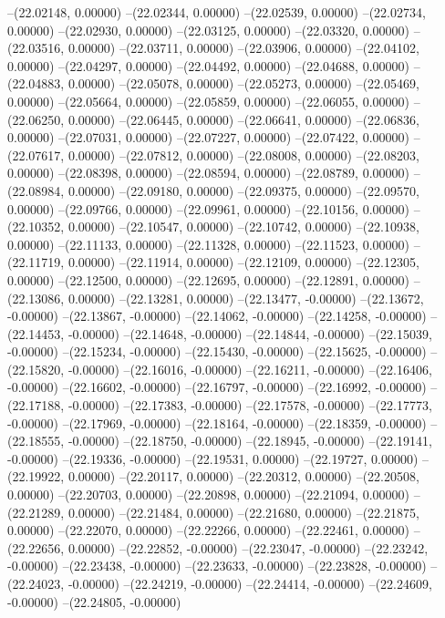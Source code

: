 --(22.02148, 0.00000)
--(22.02344, 0.00000)
--(22.02539, 0.00000)
--(22.02734, 0.00000)
--(22.02930, 0.00000)
--(22.03125, 0.00000)
--(22.03320, 0.00000)
--(22.03516, 0.00000)
--(22.03711, 0.00000)
--(22.03906, 0.00000)
--(22.04102, 0.00000)
--(22.04297, 0.00000)
--(22.04492, 0.00000)
--(22.04688, 0.00000)
--(22.04883, 0.00000)
--(22.05078, 0.00000)
--(22.05273, 0.00000)
--(22.05469, 0.00000)
--(22.05664, 0.00000)
--(22.05859, 0.00000)
--(22.06055, 0.00000)
--(22.06250, 0.00000)
--(22.06445, 0.00000)
--(22.06641, 0.00000)
--(22.06836, 0.00000)
--(22.07031, 0.00000)
--(22.07227, 0.00000)
--(22.07422, 0.00000)
--(22.07617, 0.00000)
--(22.07812, 0.00000)
--(22.08008, 0.00000)
--(22.08203, 0.00000)
--(22.08398, 0.00000)
--(22.08594, 0.00000)
--(22.08789, 0.00000)
--(22.08984, 0.00000)
--(22.09180, 0.00000)
--(22.09375, 0.00000)
--(22.09570, 0.00000)
--(22.09766, 0.00000)
--(22.09961, 0.00000)
--(22.10156, 0.00000)
--(22.10352, 0.00000)
--(22.10547, 0.00000)
--(22.10742, 0.00000)
--(22.10938, 0.00000)
--(22.11133, 0.00000)
--(22.11328, 0.00000)
--(22.11523, 0.00000)
--(22.11719, 0.00000)
--(22.11914, 0.00000)
--(22.12109, 0.00000)
--(22.12305, 0.00000)
--(22.12500, 0.00000)
--(22.12695, 0.00000)
--(22.12891, 0.00000)
--(22.13086, 0.00000)
--(22.13281, 0.00000)
--(22.13477, -0.00000)
--(22.13672, -0.00000)
--(22.13867, -0.00000)
--(22.14062, -0.00000)
--(22.14258, -0.00000)
--(22.14453, -0.00000)
--(22.14648, -0.00000)
--(22.14844, -0.00000)
--(22.15039, -0.00000)
--(22.15234, -0.00000)
--(22.15430, -0.00000)
--(22.15625, -0.00000)
--(22.15820, -0.00000)
--(22.16016, -0.00000)
--(22.16211, -0.00000)
--(22.16406, -0.00000)
--(22.16602, -0.00000)
--(22.16797, -0.00000)
--(22.16992, -0.00000)
--(22.17188, -0.00000)
--(22.17383, -0.00000)
--(22.17578, -0.00000)
--(22.17773, -0.00000)
--(22.17969, -0.00000)
--(22.18164, -0.00000)
--(22.18359, -0.00000)
--(22.18555, -0.00000)
--(22.18750, -0.00000)
--(22.18945, -0.00000)
--(22.19141, -0.00000)
--(22.19336, -0.00000)
--(22.19531, 0.00000)
--(22.19727, 0.00000)
--(22.19922, 0.00000)
--(22.20117, 0.00000)
--(22.20312, 0.00000)
--(22.20508, 0.00000)
--(22.20703, 0.00000)
--(22.20898, 0.00000)
--(22.21094, 0.00000)
--(22.21289, 0.00000)
--(22.21484, 0.00000)
--(22.21680, 0.00000)
--(22.21875, 0.00000)
--(22.22070, 0.00000)
--(22.22266, 0.00000)
--(22.22461, 0.00000)
--(22.22656, 0.00000)
--(22.22852, -0.00000)
--(22.23047, -0.00000)
--(22.23242, -0.00000)
--(22.23438, -0.00000)
--(22.23633, -0.00000)
--(22.23828, -0.00000)
--(22.24023, -0.00000)
--(22.24219, -0.00000)
--(22.24414, -0.00000)
--(22.24609, -0.00000)
--(22.24805, -0.00000)
